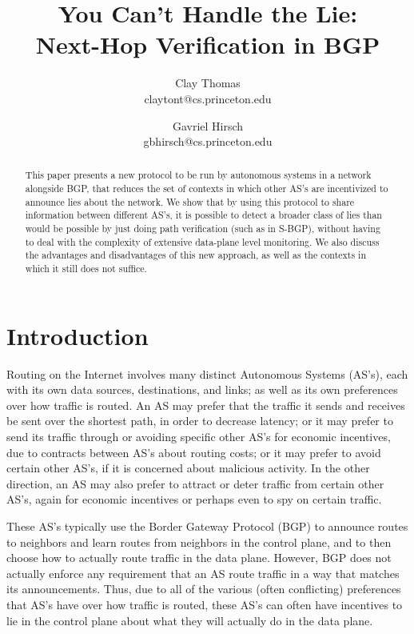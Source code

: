 \documentclass[10pt]{article}
\begin{document}

\title{
  You Can't Handle the Lie: \\
  Next-Hop Verification in BGP
}
\author{
  Clay Thomas\\ claytont@cs.princeton.edu
  \and 
  Gavriel Hirsch\\ gbhirsch@cs.princeton.edu 
}
\maketitle

\begin{abstract}
  This paper presents a new protocol to be run by autonomous systems in a network alongside BGP, that reduces the set of contexts in which other AS's are incentivized to announce lies about the network. We show that by using this protocol to share information between different AS's, it is possible to detect a broader class of lies than would be possible by just doing path verification (such as in S-BGP), without having to deal with the complexity of extensive data-plane level monitoring. We also discuss the advantages and disadvantages of this new approach, as well as the contexts in which it still does not suffice.
\end{abstract}


\section{Introduction}
Routing on the Internet involves many distinct Autonomous Systems (AS's), each with its own data sources, destinations, and links; as well as its own preferences over how traffic is routed. An AS may prefer that the traffic it sends and receives be sent over the shortest path, in order to decrease latency; or it may prefer to send its traffic through or avoiding specific other AS's for economic incentives, due to contracts between AS's about routing costs; or it may prefer to avoid certain other AS's, if it is concerned about malicious activity. In the other direction, an AS may also prefer to attract or deter traffic from certain other AS's, again for economic incentives or perhaps even to spy on certain traffic.

These AS's typically use the Border Gateway Protocol (BGP) to announce routes to neighbors and learn routes from neighbors in the control plane, and to then choose how to actually route traffic in the data plane. However, BGP does not actually enforce any requirement that an AS route traffic in a way that matches its announcements. Thus, due to all of the various (often conflicting) preferences that AS's have over how traffic is routed, these AS's can often have incentives to lie in the control plane about what they will actually do in the data plane.
\end{document}
